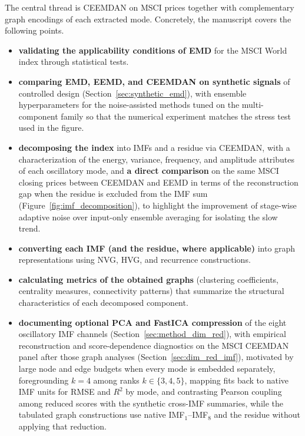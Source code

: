 \documentclass[11pt,a4paper]{article}
\begin{document}
The central thread is CEEMDAN on MSCI prices together with complementary graph encodings of each extracted mode. Concretely, the manuscript covers the following points.
\begin{itemize}
    \item \textbf{validating the applicability conditions of EMD} for the MSCI World index through statistical tests.
    \item \textbf{comparing EMD, EEMD, and CEEMDAN on synthetic signals} of controlled design (Section~\ref{sec:synthetic_emd}), with ensemble hyperparameters for the noise-assisted methods tuned on the multi-component family so that the numerical experiment matches the stress test used in the figure.
    \item \textbf{decomposing the index} into IMFs and a residue via CEEMDAN, with a characterization of the energy, variance, frequency, and amplitude attributes of each oscillatory mode, and \textbf{a direct comparison} on the same MSCI closing prices between CEEMDAN and EEMD in terms of the reconstruction gap when the residue is excluded from the IMF sum (Figure~\ref{fig:imf_decomposition}), to highlight the improvement of stage-wise adaptive noise over input-only ensemble averaging for isolating the slow trend.
    \item \textbf{converting each IMF (and the residue, where applicable)} into graph representations using NVG, HVG, and recurrence constructions.
    \item \textbf{calculating metrics of the obtained graphs} (clustering coefficients, centrality measures, connectivity patterns) that summarize the structural characteristics of each decomposed component.
    \item \textbf{documenting optional PCA and FastICA compression} of the eight oscillatory IMF channels (Section~\ref{sec:method_dim_red}), with empirical reconstruction and score-dependence diagnostics on the MSCI CEEMDAN panel after those graph analyses (Section~\ref{sec:dim_red_imf}), motivated by large node and edge budgets when every mode is embedded separately, foregrounding $k=4$ among ranks $k\in\{3,4,5\}$, mapping fits back to native IMF units for RMSE and $R^2$ by mode, and contrasting Pearson coupling among reduced scores with the synthetic cross-IMF summaries, while the tabulated graph constructions use native IMF$_1$--IMF$_8$ and the residue without applying that reduction.
\end{itemize}
\end{document}

